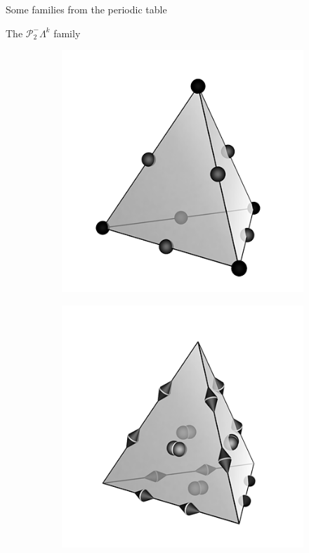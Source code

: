\documentclass[aspectratio=169]{beamer}
\begin{document}
\begin{frame}{Some families from the periodic table}
\begin{figure}[t]
\begin{subfigure}[t]{0.23\textwidth}
	\end{subfigure}\hfill
\end{figure}
The $\mathcal{P}^-_2\Lambda^k$ family
\begin{figure}
	\begin{subfigure}[t]{0.23\textwidth}
		\includegraphics[width=\columnwidth]{P2_tetrahedron.png}%
	\end{subfigure}
	\begin{subfigure}[t]{0.23\textwidth}
		\includegraphics[width=\columnwidth]{N1e2_tetrahedron.png}%

\end{subfigure}
\end{figure}
\end{frame}
\end{document}
